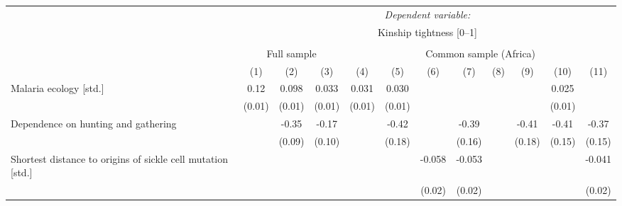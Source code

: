 {\begin{tabular}{l*{11}{c}}\toprule\toprule&\multicolumn{11}{c}{\textit{Dependent variable:}}\\[.1cm] & \multicolumn{11}{c}{Kinship tightness [0--1]}\\\cmidrule(lr){2-12} \\ &\multicolumn{3}{c}{Full sample} &\multicolumn{8}{c}{Common sample (Africa)}\\\cmidrule(lr){2-4}\cmidrule(lr){5-12}
                &\multicolumn{1}{c}{(1)}         &\multicolumn{1}{c}{(2)}         &\multicolumn{1}{c}{(3)}         &\multicolumn{1}{c}{(4)}         &\multicolumn{1}{c}{(5)}         &\multicolumn{1}{c}{(6)}         &\multicolumn{1}{c}{(7)}         &\multicolumn{1}{c}{(8)}         &\multicolumn{1}{c}{(9)}         &\multicolumn{1}{c}{(10)}         &\multicolumn{1}{c}{(11)}         \\
\midrule
Malaria ecology [std.]&     0.12\sym{***}&    0.098\sym{***}&    0.033\sym{**} &    0.031\sym{**} &    0.030\sym{**} &                  &                  &                  &                  &    0.025\sym{**} &                  \\
                &   (0.01)         &   (0.01)         &   (0.01)         &   (0.01)         &   (0.01)         &                  &                  &                  &                  &   (0.01)         &                  \\
\addlinespace
Dependence on hunting and gathering&                  &    -0.35\sym{***}&    -0.17\sym{*}  &                  &    -0.42\sym{**} &                  &    -0.39\sym{**} &                  &    -0.41\sym{**} &    -0.41\sym{***}&    -0.37\sym{**} \\
                &                  &   (0.09)         &   (0.10)         &                  &   (0.18)         &                  &   (0.16)         &                  &   (0.18)         &   (0.15)         &   (0.15)         \\
\addlinespace
Shortest distance to origins of sickle cell mutation [std.]&                  &                  &                  &                  &                  &   -0.058\sym{**} &   -0.053\sym{***}&                  &                  &                  &   -0.041\sym{**} \\
                &                  &                  &                  &                  &                  &   (0.02)         &   (0.02)         &                  &                  &                  &   (0.02)         \\

\end{tabular}}
